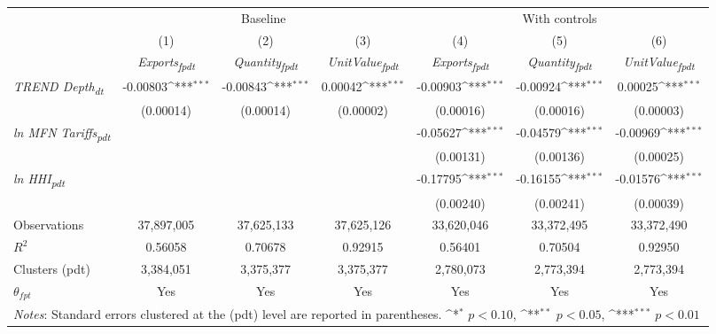 {
\def\sym#1{\ifmmode^{#1}\else\(^{#1}\)\fi}
\begin{tabular}{l*{6}{c}}
\toprule
&\multicolumn{3}{c}{Baseline}&\multicolumn{3}{c}{With controls}\\\cmidrule(lr){2-4}\cmidrule(lr){5-7}
&(1)&(2)&(3)&(4)&(5)&(6)\\
&\textit{Exports\textsubscript{fpdt}}&\textit{Quantity\textsubscript{fpdt}}&\textit{UnitValue\textsubscript{fpdt}}&\textit{Exports\textsubscript{fpdt}}&\textit{Quantity\textsubscript{fpdt}}&\textit{UnitValue\textsubscript{fpdt}}\\
\midrule
\textit{TREND Depth\textsubscript{dt}} & -0.00803\sym{***} & -0.00843\sym{***} & 0.00042\sym{***} & -0.00903\sym{***} & -0.00924\sym{***} & 0.00025\sym{***}\\
 & (0.00014) & (0.00014) & (0.00002) & (0.00016) & (0.00016) & (0.00003)\\
\addlinespace
\textit{ln MFN Tariffs\textsubscript{pdt}} &  &  &  & -0.05627\sym{***} & -0.04579\sym{***} & -0.00969\sym{***}\\
 &  &  &  & (0.00131) & (0.00136) & (0.00025)\\
\addlinespace
\textit{ln HHI\textsubscript{pdt}} &  &  &  & -0.17795\sym{***} & -0.16155\sym{***} & -0.01576\sym{***}\\
 &  &  &  & (0.00240) & (0.00241) & (0.00039)\\
\midrule
Observations & 37,897,005 & 37,625,133 & 37,625,126 & 33,620,046 & 33,372,495 & 33,372,490\\
$R^{2}$ & 0.56058 & 0.70678 & 0.92915 & 0.56401 & 0.70504 & 0.92950\\
Clusters (pdt) & 3,384,051 & 3,375,377 & 3,375,377 & 2,780,073 & 2,773,394 & 2,773,394\\
$\theta_{fpt}$ & Yes & Yes & Yes & Yes & Yes & Yes\\
\bottomrule
\multicolumn{7}{l}{\footnotesize \textit{Notes}: Standard errors clustered at the (pdt) level are reported in parentheses. \sym{*} \(p<0.10\), \sym{**} \(p<0.05\), \sym{***} \(p<0.01\)}\\
\end{tabular}
}
